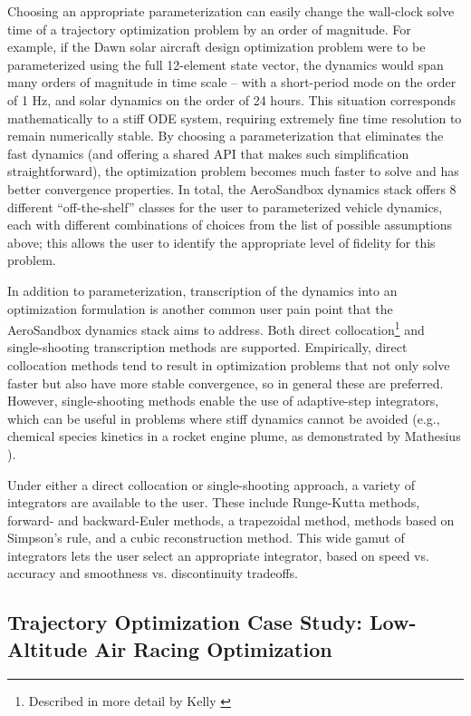 Choosing an appropriate parameterization can easily change the wall-clock solve time of a trajectory optimization problem by an order of magnitude. For example, if the Dawn solar aircraft design optimization problem were to be parameterized using the full 12-element state vector, the dynamics would span many orders of magnitude in time scale -- with a short-period mode on the order of 1 Hz, and solar dynamics on the order of 24 hours. This situation corresponds mathematically to a stiff ODE system, requiring extremely fine time resolution to remain numerically stable. By choosing a parameterization that eliminates the fast dynamics (and offering a shared API that makes such simplification straightforward), the optimization problem becomes much faster to solve and has better convergence properties. In total, the AeroSandbox dynamics stack offers 8 different ``off-the-shelf'' classes for the user to parameterized vehicle dynamics, each with different combinations of choices from the list of possible assumptions above; this allows the user to identify the appropriate level of fidelity for this problem.

In addition to parameterization, transcription of the dynamics into an optimization formulation is another common user pain point that the AeroSandbox dynamics stack aims to address. Both direct collocation\footnote{Described in more detail by Kelly \cite{kelly_introduction_2017}} and single-shooting transcription methods are supported. Empirically, direct collocation methods tend to result in optimization problems that not only solve faster but also have more stable convergence, so in general these are preferred. However, single-shooting methods enable the use of adaptive-step integrators, which can be useful in problems where stiff dynamics cannot be avoided (e.g., chemical species kinetics in a rocket engine plume, as demonstrated by Mathesius \cite{mathesius_integrated_2023}).

Under either a direct collocation or single-shooting approach, a variety of integrators are available to the user. These include Runge-Kutta methods, forward- and backward-Euler methods, a trapezoidal method, methods based on Simpson's rule, and a cubic reconstruction method. This wide gamut of integrators lets the user select an appropriate integrator, based on speed vs. accuracy and smoothness vs. discontinuity tradeoffs.

\subsection{Trajectory Optimization Case Study: Low-Altitude Air Racing Optimization}

